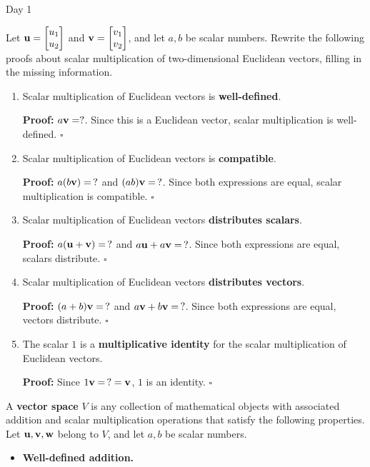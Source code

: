 \begin{applicationActivities}{Day 1}
\begin{activity}{15}
Let \(\mathbf u=\begin{bmatrix} u_1 \\ u_2 \end{bmatrix}\) and
\(\mathbf v=\begin{bmatrix} v_1 \\ v_2 \end{bmatrix}\), and let \(a,b\) be
scalar numbers.
Rewrite the following proofs about scalar multiplication of
two-dimensional Euclidean vectors,
filling in the missing information.
\begin{enumerate}
  \item Scalar multiplication of Euclidean vectors is \textbf{well-defined}.

        \textbf{Proof:} \(a\mathbf v=?\). Since this is a Euclidean
        vector, scalar multiplication is well-defined. \(\square\)
  \item Scalar multiplication of Euclidean vectors is \textbf{compatible}.

        \textbf{Proof:} \(a(b\mathbf v)=\,?\) and
        \((ab)\mathbf v=\,?\). Since both expressions are equal,
        scalar multiplication is compatible. \(\square\)
  \item Scalar multiplication of Euclidean vectors
        \textbf{distributes scalars}.

        \textbf{Proof:} \(a(\mathbf u+\mathbf v)=\,?\) and
        \(a\mathbf u+a\mathbf v=\,?\). Since both expressions are equal,
        scalars distribute. \(\square\)
  \item Scalar multiplication of Euclidean vectors
        \textbf{distributes vectors}.

        \textbf{Proof:} \((a+b)\mathbf v=\,?\) and
        \(a\mathbf v+b\mathbf v=\,?\). Since both expressions are equal,
        vectors distribute. \(\square\)
  \item The scalar \(1\) is a \textbf{multiplicative identity} for the
        scalar multiplication of Euclidean vectors.

        \textbf{Proof:} Since
        \(1\mathbf v=\,?=\mathbf v\), \(1\) is an identity. \(\square\)
\end{enumerate}
\end{activity}

\begin{definition}
  A \textbf{vector space} \(V\) is any collection of mathematical objects with
  associated addition and scalar multiplication operations that satisfy
  the following properties. Let \(\mathbf u,\mathbf v,\mathbf w\) belong to \(V\),
  and let \(a,b\) be scalar numbers.
  \begin{multicols}{2}
  \begin{itemize}
    \item \textbf{Well-defined addition.}


\end{itemize}
\end{multicols}
\end{definition}
\end{applicationActivities}
